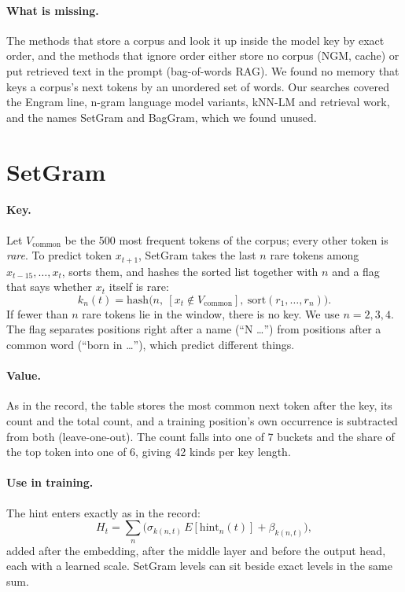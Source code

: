 \documentclass[11pt]{article}
\begin{document}
\paragraph{What is missing.} The methods that store a corpus and look it up inside the model key by exact order, and the methods that ignore order either store no corpus (NGM, cache) or put retrieved text in the prompt (bag-of-words RAG). We found no memory that keys a corpus's next tokens by an unordered set of words. Our searches covered the Engram line, n-gram language model variants, kNN-LM and retrieval work, and the names SetGram and BagGram, which we found unused.

\section{SetGram}\label{sec:setgram}
\paragraph{Key.} Let $V_{\text{common}}$ be the 500 most frequent tokens of the corpus; every other token is \emph{rare}. To predict token $x_{t+1}$, SetGram takes the last $n$ rare tokens among $x_{t-15},\dots,x_t$, sorts them, and hashes the sorted list together with $n$ and a flag that says whether $x_t$ itself is rare:
\begin{equation}
k_n(t)=\mathrm{hash}\big(n,\ [x_t\notin V_{\text{common}}],\ \mathrm{sort}(r_1,\dots,r_n)\big).
\end{equation}
If fewer than $n$ rare tokens lie in the window, there is no key. We use $n=2,3,4$. The flag separates positions right after a name (``N \ldots'') from positions after a common word (``born in \ldots''), which predict different things.

\paragraph{Value.} As in the record, the table stores the most common next token after the key, its count and the total count, and a training position's own occurrence is subtracted from both (leave-one-out). The count falls into one of 7 buckets and the share of the top token into one of 6, giving 42 kinds per key length.

\paragraph{Use in training.} The hint enters exactly as in the record:
\begin{equation}
H_t=\sum_{n}\big(\sigma_{k(n,t)}\,E[\mathrm{hint}_n(t)]+\beta_{k(n,t)}\big),
\end{equation}
added after the embedding, after the middle layer and before the output head, each with a learned scale. SetGram levels can sit beside exact levels in the same sum.
\end{document}
